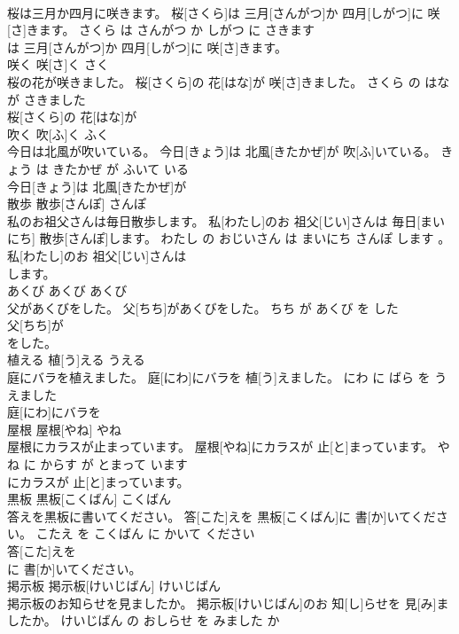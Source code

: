 \documentclass[8pt]{extreport}
\begin{document}
\begin{CJK}{UTF8}{min}
\\	桜は三月か四月に咲きます。	桜[さくら]は 三月[さんがつ]か 四月[しがつ]に 咲[さ]きます。	さくら は さんがつ か しがつ に さきます	
\\	は 三月[さんがつ]か 四月[しがつ]に 咲[さ]きます。		
\\	咲く	咲[さ]く	さく	
\\	桜の花が咲きました。	桜[さくら]の 花[はな]が 咲[さ]きました。	さくら の はな が さきました	
\\	桜[さくら]の 花[はな]が
\\	吹く	吹[ふ]く	ふく	
\\	今日は北風が吹いている。	今日[きょう]は 北風[きたかぜ]が 吹[ふ]いている。	きょう は きたかぜ が ふいて いる	
\\	今日[きょう]は 北風[きたかぜ]が
\\	散歩	散歩[さんぽ]	さんぽ	
\\	私のお祖父さんは毎日散歩します。	私[わたし]のお 祖父[じい]さんは 毎日[まいにち] 散歩[さんぽ]します。	わたし の おじいさん は まいにち さんぽ します 。	
\\	私[わたし]のお 祖父[じい]さんは
\\	します。		
\\	あくび	あくび	あくび	
\\	父があくびをした。	父[ちち]があくびをした。	ちち が あくび を した	
\\	父[ちち]が
\\	をした。		
\\	植える	植[う]える	うえる	
\\	庭にバラを植えました。	庭[にわ]にバラを 植[う]えました。	にわ に ばら を うえました	
\\	庭[にわ]にバラを
\\	屋根	屋根[やね]	やね	
\\	屋根にカラスが止まっています。	屋根[やね]にカラスが 止[と]まっています。	やね に からす が とまって います	
\\	にカラスが 止[と]まっています。		
\\	黒板	黒板[こくばん]	こくばん	
\\	答えを黒板に書いてください。	答[こた]えを 黒板[こくばん]に 書[か]いてください。	こたえ を こくばん に かいて ください	
\\	答[こた]えを
\\	に 書[か]いてください。		
\\	掲示板	掲示板[けいじばん]	けいじばん	
\\	掲示板のお知らせを見ましたか。	掲示板[けいじばん]のお 知[し]らせを 見[み]ましたか。	けいじばん の おしらせ を みました か	

\end{CJK}
\end{document}
